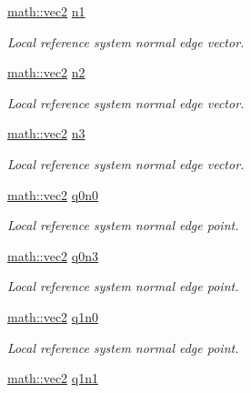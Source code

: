 \begin{DoxyCompactItemize}
\hyperlink{structphysim_1_1math_1_1vec2}{math\+::vec2} \hyperlink{classphysim_1_1geometric_1_1rectangle_a3d075b4865232e66ff9e6d3d60970e1e}{n1}
\begin{DoxyCompactList}\small\item\em Local reference system normal edge vector. \end{DoxyCompactList}\item 
\hyperlink{structphysim_1_1math_1_1vec2}{math\+::vec2} \hyperlink{classphysim_1_1geometric_1_1rectangle_a0f79adf34a89ed7d8033aa1ad037ba2f}{n2}
\begin{DoxyCompactList}\small\item\em Local reference system normal edge vector. \end{DoxyCompactList}\item 
\hyperlink{structphysim_1_1math_1_1vec2}{math\+::vec2} \hyperlink{classphysim_1_1geometric_1_1rectangle_a225b6af98f7ce91c6b0f4fc1aee25f72}{n3}
\begin{DoxyCompactList}\small\item\em Local reference system normal edge vector. \end{DoxyCompactList}\item 
\hyperlink{structphysim_1_1math_1_1vec2}{math\+::vec2} \hyperlink{classphysim_1_1geometric_1_1rectangle_a6643ef4e07ab484fa12dc9e323729313}{q0n0}
\begin{DoxyCompactList}\small\item\em Local reference system normal edge point. \end{DoxyCompactList}\item 
\hyperlink{structphysim_1_1math_1_1vec2}{math\+::vec2} \hyperlink{classphysim_1_1geometric_1_1rectangle_a8d187e23082333ee1eef5877d2d541c1}{q0n3}
\begin{DoxyCompactList}\small\item\em Local reference system normal edge point. \end{DoxyCompactList}\item 
\hyperlink{structphysim_1_1math_1_1vec2}{math\+::vec2} \hyperlink{classphysim_1_1geometric_1_1rectangle_a8b01c943d345df7a999a3122e67eaf71}{q1n0}
\begin{DoxyCompactList}\small\item\em Local reference system normal edge point. \end{DoxyCompactList}\item 
\hyperlink{structphysim_1_1math_1_1vec2}{math\+::vec2} \hyperlink{classphysim_1_1geometric_1_1rectangle_af175cbc553e71d5ad74844e3f53bbd9d}{q1n1}

\end{DoxyCompactItemize}
